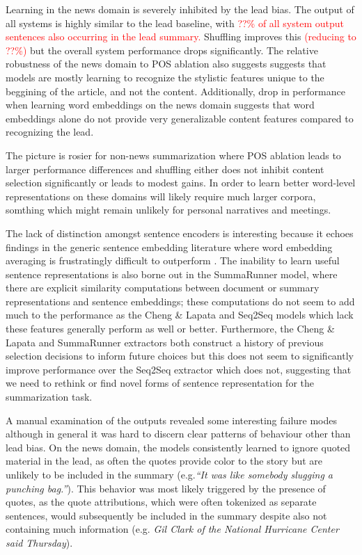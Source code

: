 Learning in the news domain is severely inhibited by the lead bias. 
The output of all systems is highly similar to the lead baseline,
with \textcolor{red}{??\% of all system output sentences also occurring
in the lead summary.} Shuffling improves this 
\textcolor{red}{(reducing to ??\%)} but the overall system performance drops
    significantly.
    The relative robustness of the news domain to POS ablation also suggests
    suggests that models are mostly learning to recognize the stylistic 
    features unique to the beggining of the article, and not the content.
    Additionally, drop in performance when learning word embeddings on 
    the news domain suggests that word embeddings alone do not provide 
    very generalizable content features compared to recognizing the lead.

The picture is rosier for non-news summarization where POS ablation leads
to larger performance differences and shuffling either does not inhibit content
selection significantly or leads to modest gains. In order to learn better
word-level representations on these domains will likely require much
larger corpora, somthing which might remain unlikely for personal narratives
and meetings.



The lack of distinction amongst sentence encoders is interesting because 
it echoes findings in the generic sentence embedding literature 
where word embedding averaging is frustratingly difficult to 
outperform  \cite{wieting2015towards,arora2016simple,wieting2017revisiting}.
The inability to learn useful sentence representations is also 
borne out in the 
SummaRunner model, where there are explicit similarity computations
between document or summary representations and sentence embeddings;
these computations do not seem to add much to the performance as the 
Cheng \& Lapata and Seq2Seq models which lack these features generally
perform as well or better.
Furthermore, the Cheng \& Lapata and SummaRunner extractors both construct
a history of previous selection decisions to inform future choices but this
does not seem to significantly improve performance over the Seq2Seq extractor 
which does not, suggesting that we need to rethink or find novel forms 
of sentence representation for the summarization task.


A manual examination of the outputs revealed some interesting failure modes
although in general it was hard to discern clear patterns of behaviour 
other than lead bias. On the news domain, the models consistently learned 
to ignore quoted material in the lead, as often the quotes provide
color to the story but are unlikely to be included in the summary (e.g.\textit{``It was like somebody slugging a punching bag.''}). 
This behavior was most likely triggered by the presence of quotes, as the
quote attributions, which were often tokenized as separate sentences,
would subsequently be included in the summary despite also not containing 
much information 
(e.g. \textit{Gil Clark of the National Hurricane Center said Thursday}).




